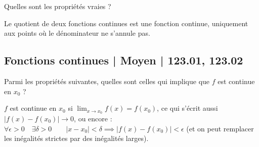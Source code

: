 \begin{question}
Quelles sont les propriétés vraies ?
\begin{answers}



\end{answers}
\begin{explanations}
Le quotient de deux fonctions continues est une fonction continue, uniquement aux points où le dénominateur ne s'annule pas.
\end{explanations}
\end{question}


\subsection{Fonctions continues | Moyen | 123.01, 123.02}


\begin{question}
Parmi les propriétés suivantes, quelles sont celles qui implique que $f$ est continue en $x_ 0$ ?
\begin{answers}



    
\end{answers}
\begin{explanations}
$f$ est continue en $x_0$ si $\lim_{x\to x_0} f(x) = f(x_0)$, ce qui s'écrit aussi $\big| f(x) - f(x_0) \big| \to 0$, ou encore :
$\forall \epsilon >0 \quad \exists \delta > 0 \qquad
    |x-x_0| < \delta \implies |f(x)-f(x_0)| < \epsilon$ (et on peut remplacer les inégalités strictes par des inégalités larges).
\end{explanations}
\end{question}


